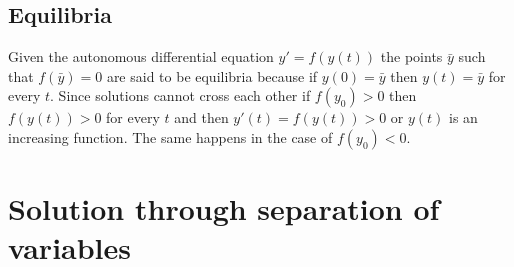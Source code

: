 	\subsection{Equilibria}
	Given the autonomous differential equation $y' = f(y(t))$ the points $\bar{y}$ such that $f(\bar{y})=0$ are said to be equilibria because if $y(0) = \bar{y}$ then $y(t) = \bar{y}$ for every $t$.
	Since solutions cannot cross each other if $f(y_0)>0$ then $f(y(t))>0$ for every $t$ and then $y'(t) = f(y(t))>0$ or $y(t)$ is an increasing function.
	The same happens in the case of $f(y_0)<0$.

\section{Solution through separation of variables}
